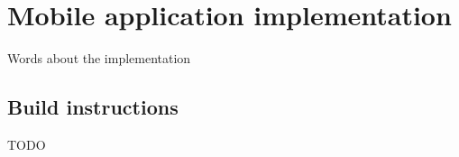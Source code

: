 \chapter{Mobile application implementation}\label{ch:mobile-application-implementation}

Words about the implementation

\section{Build instructions}\label{sec:build-instructions}
TODO